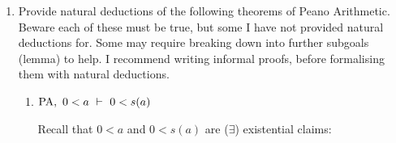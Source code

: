 \documentclass[11pt]{report}
\begin{document}
\begin{enumerate}
\begin{enumerate}
		$\mathcal{D}_{BC}$: First state and prove the base case 

		$$ \PA \vdash \forall y \ (y + 0 = 0 + y)$$

		\begin{mdframed}
			\begin{center}
				$\begin{array}{c}
					\infer[=E]{a + 0 = 0 + a}
						{\infer[=E]{a + 0 = a}
							{\infer[=I]{a=a}{}
							&
							\infer[\forall E]{a + 0 = a}{\PA 3}}
						&
						\infer[\THM]{0 + a = a}{\PA}}
				\end{array}$
			\end{center}
		\end{mdframed}

		$\mathcal{D}_{IS}$: Next state and prove the induction step

		$$ \PA, \ \forall y \ (y + n  = n + y) \ \vdash \ \forall y \ (y + s(n)  = s(n) + y)$$

		\begin{mdframed}
			\begin{center}
				$\begin{array}{c}
					\infer[=E]{a + s(n) = s(n) + a}
						{\infer[=E]{a + s(n) = s(n + a)}
							{\infer[\forall E]{a + s(n) = s(a+n)}
								{\PA 4}
							&
							\infer[\IH]{a + n = n + a}
								{}}
						&
						\infer[\THM]{s(n) + a = s(n+a)}{\PA}}
				\end{array}$
			\end{center}
		\end{mdframed}
		
		See the Logic section on the course webpage for a complete proof of the commutativity of addition, if you dare.
		
		\newpage
	\end{enumerate}

	\newpage
	\item Provide natural deductions of the following theorems of Peano Arithmetic. Beware each of these must be true, but some I have not provided natural deductions for. Some may require breaking down into further subgoals (lemma) to help. I recommend writing informal proofs, before formalising them with natural deductions.
	
		\begin{enumerate}
			\item $\text{PA} , \ 0 < a \ \vdash \ 0 < s(a)$
			
			Recall that $0 < a$ and $0 < s(a)$ are ($\exists$) existential claims:
			

\end{enumerate}
\end{enumerate}
\end{document}
